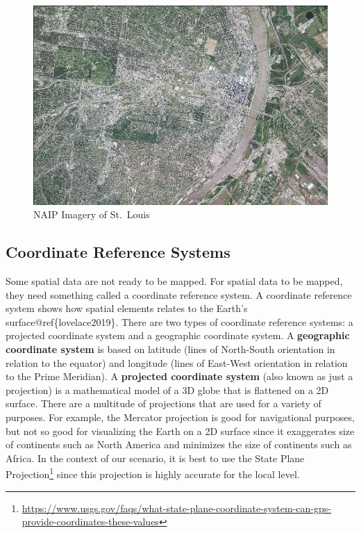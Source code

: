 \documentclass[
  krantz2]{krantz}
\begin{document}
\begin{figure}
\centering
\includegraphics{images/stl_naip.jpg}
\caption{NAIP Imagery of St.~Louis}
\end{figure}

\hypertarget{coordinate-reference-systems}{%
\subsection{Coordinate Reference Systems}\label{coordinate-reference-systems}}

Some spatial data are not ready to be mapped. For spatial data to be mapped, they need something called a coordinate reference system. A coordinate reference system shows how spatial elements relates to the Earth's surface@ref\{lovelace2019\}. There are two types of coordinate reference systems: a projected coordinate system and a geographic coordinate system. A \textbf{geographic coordinate system} is based on latitude (lines of North-South orientation in relation to the equator) and longitude (lines of East-West orientation in relation to the Prime Meridian). A \textbf{projected coordinate system} (also known as just a projection) is a mathematical model of a 3D globe that is flattened on a 2D surface. There are a multitude of projections that are used for a variety of purposes. For example, the Mercator projection is good for navigational purposes, but not so good for visualizing the Earth on a 2D surface since it exaggerates size of continents such as North America and minimizes the size of continents such as Africa. In the context of our scenario, it is best to use the State Plane Projection\footnote{\url{https://www.usgs.gov/faqs/what-state-plane-coordinate-system-can-gps-provide-coordinates-these-values}} since this projection is highly accurate for the local level.
\end{document}
